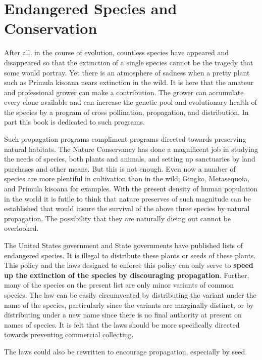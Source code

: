 \chapter{Endangered Species and Conservation}

After all, in the course of evolution, countless species have appeared and
disappeared so that the extinction of a single species cannot be the tragedy that some
would portray. Yet there is an atmosphere of sadness when a pretty plant such as
Primula kisoana nears extinction in the wild. It is here that the amateur and
professional grower can make a contribution. The grower can accumulate every clone
available and can increase the genetic pool and evolutionary health of the species by
a program of cross pollination, propagation, and distribution. In part this book is
dedicated to such programs.

Such propagation programs compliment programs directed towards preserving
natural habitats. The Nature Conservancy has done a magnificent job in studying the
needs of species, both plants and animals, and setting up sanctuaries by land
purchases and other means. But this is not enough. Even now a number of species
are more plentiful in cultivation than in the wild; Gingko, Metasequoia, and Primula
kisoana for examples. With the present density of human population in the world it is
futile to think that nature preserves of such magnitude can be established that would
insure the survival of the above three species by natural propagation. The possibility
that they are naturally dieing out cannot be overlooked.

The United States government and State governments have published lists of
endangered species. It is illegal to distribute these plants or seeds of these plants.
This policy and the laws designed to enforce this policy can only serve to
\textbf{speed up the extinction of the species by discouraging propagation}. Further, many of
the species on the present list are only minor variants of common species. The law
can be easily circumvented by distributing the variant under the name of the species,
particularly since the variants are marginally distinct, or by distributing under a new
name since there is no final authority at present on names of species. It is felt that the
laws should be more specifically directed towards preventing commercial collecting.

The laws could also be rewritten to encourage propagation, especially by seed.


